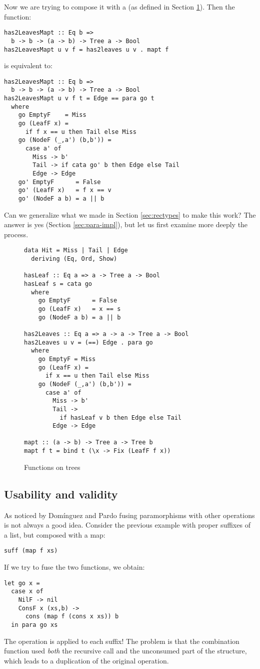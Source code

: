 Now we are trying to compose it with a  (as defined in Section \ref{fig:has2Leaves}). Then the function:
\begin{verbatim}
has2LeavesMapt :: Eq b =>
  b -> b -> (a -> b) -> Tree a -> Bool
has2LeavesMapt u v f = has2leaves u v . mapt f
\end{verbatim}
\noindent is equivalent to:
\begin{verbatim}
has2LeavesMapt :: Eq b =>
  b -> b -> (a -> b) -> Tree a -> Bool
has2LeavesMapt u v f t = Edge == para go t
  where
    go EmptyF    = Miss
    go (LeafF x) =
      if f x == u then Tail else Miss
    go (NodeF (_,a') (b,b')) =
      case a' of
        Miss -> b'
        Tail -> if cata go' b then Edge else Tail
        Edge -> Edge
    go' EmptyF      = False
    go' (LeafF x)   = f x == v
    go' (NodeF a b) = a || b
\end{verbatim}

\noindent Can we generalize what we made in Section \ref{sec:rectypes} to make this work? The answer is yes (Section \ref{sec:para-impl}), but let us first examine more deeply the process.

\begin{figure}
\begin{verbatim}
data Hit = Miss | Tail | Edge
  deriving (Eq, Ord, Show)

hasLeaf :: Eq a => a -> Tree a -> Bool
hasLeaf s = cata go
  where
    go EmptyF      = False
    go (LeafF x)   = x == s
    go (NodeF a b) = a || b

has2Leaves :: Eq a => a -> a -> Tree a -> Bool
has2Leaves u v = (==) Edge . para go
  where
    go EmptyF = Miss
    go (LeafF x) =
      if x == u then Tail else Miss
    go (NodeF (_,a') (b,b')) =
      case a' of
        Miss -> b'
        Tail ->
          if hasLeaf v b then Edge else Tail
        Edge -> Edge

mapt :: (a -> b) -> Tree a -> Tree b
mapt f t = bind t (\x -> Fix (LeafF f x))
\end{verbatim}
\caption{Functions on trees}
\label{fig:has2Leaves}
\end{figure}

\subsection{Usability and validity}
As noticed by Domínguez and Pardo \cite{paramorphismFusion} fusing paramorphisms with other operations is not always a good idea. Consider the previous example with proper suffixes of a list, but composed with a map:
\begin{verbatim}
suff (map f xs)
\end{verbatim}
\noindent If we try to fuse the two functions, we obtain:
\begin{verbatim}
let go x =
  case x of
    NilF -> nil
    ConsF x (xs,b) ->
      cons (map f (cons x xs)) b
  in para go xs
\end{verbatim}
\noindent The  operation is applied to each suffix! The problem is that the combination function used \emph{both} the recursive call and the unconsumed part of the structure, which leads to a duplication of the original  operation.

